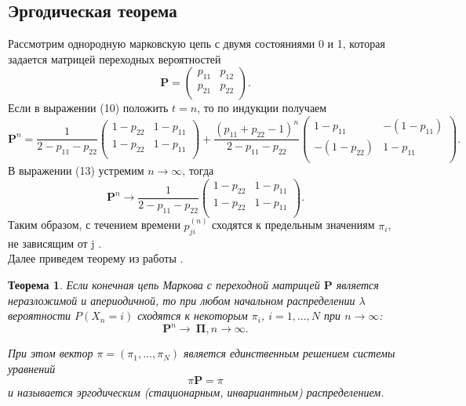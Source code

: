 \documentclass[14pt,a4paper]{article}
\begin{document}
\subsection{Эргодическая теорема}
Рассмотрим однородную марковскую цепь с двумя состояниями 0 и 1, которая задается матрицей переходных вероятностей
\begin{equation}
    \mathbf{P} = 
    \begin{pmatrix}
    p_{1 1} & p_{1 2} \\
    p_{2 1} & p_{2 2} \\
  \end{pmatrix}.
\end{equation}
Если в выражении (10) положить $t = n$, то по индукции получаем
\begin{equation}
    \mathbf{P}^n = \frac{1}{2-p_{1 1}-p_{2 2}}
    \begin{pmatrix}
    1 - p_{2 2}& 1 - p_{1 1} \\
        1 - p_{2 2}& 1 - p_{1 1} \\
  \end{pmatrix} + \frac{(p_{1 1}+p_{2 2}-1)^n}{2-p_{1 1}-p_{2 2}}
    \begin{pmatrix}
    1 - p_{1 1}& -(1 - p_{1 1}) \\
        -(1 - p_{2 2})& 1 - p_{1 1} \\
  \end{pmatrix}.
\end{equation}
В выражении (13) устремим $n \to \infty$, тогда
\begin{equation}
    \mathbf{P}^n \to
    \frac{1}{2-p_{1 1}-p_{2 2}}
    \begin{pmatrix}
    1 - p_{2 2}& 1 - p_{1 1} \\
        1 - p_{2 2}& 1 - p_{1 1} \\
  \end{pmatrix}.
\end{equation}
Таким образом, с течением времени $p_{j i}^{(n)}$ сходятся к предельным значениям $\pi_i$, не зависящим от j \cite{shir}.
\[\]
Далее приведем теорему из работы \cite{shir}.
\newtheorem{Th}{Теорема}
\begin{Th}%
Если конечная цепь Маркова с переходной матрицей $\mathbf{P}$ является неразложимой и апериодичной, то при любом начальном распределении $\lambda$ вероятности $P(X_n = i)$ сходятся к некоторым $\pi_i$, $i = 1,\dots,N$ при $n\rightarrow\infty$:
\begin{equation}
    \mathbf{P}^n \rightarrow\ \mathbf{\Pi}, n\rightarrow\infty.
\end{equation}

При этом вектор $\pi = (\pi_1,\dots,\pi_N)$ является единственным решением системы уравнений 
\begin{equation}
    \pi \mathbf{P} = \pi 
\end{equation}
и называется \textit{эргодическим (стационарным, инвариантным)} распределением. 
\end{Th}
\end{document}
